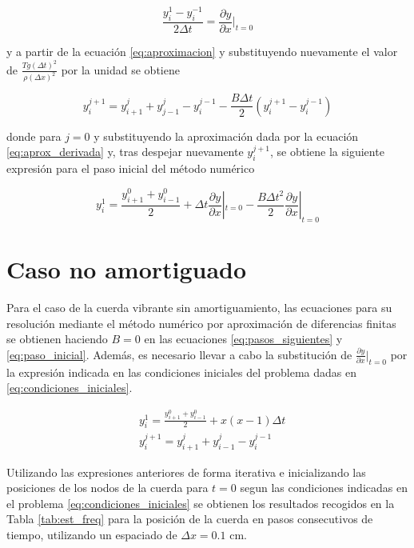 \documentclass[11pt]{article}
\begin{document}
\begin{equation}
\frac{y^1_i - y^{-1}_i}{2\Delta{t}} = \frac{\partial{y}}{\partial{x}}|_{t=0}
\label{eq:aprox_derivada}
\end{equation}

y a partir de la ecuación \eqref{eq:aproximacion} y substituyendo nuevamente el valor de 
$\frac{Tg(\Delta{t})^2}{\rho(\Delta{x})^2}$ por la unidad se obtiene

\begin{equation}
y^{j+1}_i = y^{j}_{i+1} + y^{j}_{j-1} - y^{j-1}_i - \frac{B\Delta{t}}{2}(y^{j+1}_i - y^{j-1}_i)
\end{equation}

donde para $j=0$ y substituyendo la aproximación dada por la ecuación
\ref{eq:aprox_derivada} y, tras despejar nuevamente $y^{j+1}_i$, se obtiene la siguiente
expresión para el paso inicial del método numérico

\begin{equation}
y^1_i = \frac{y^0_{i+1} + y^0_{i-1}}{2} + \Delta{t}\frac{\partial{y}}{\partial{x}}|_{t=0}
	- \frac{B\Delta{t}^2}{2}\frac{\partial{y}}{\partial{x}}|_{t=0}
\label{eq:paso_inicial}
\end{equation}

\section{Caso no amortiguado}
Para el caso de la cuerda vibrante sin amortiguamiento, las ecuaciones para su resolución
mediante el método numérico por aproximación de diferencias finitas se obtienen haciendo
$B=0$ en las ecuaciones \eqref{eq:pasos_siguientes} y \eqref{eq:paso_inicial}. Además, es
necesario llevar a cabo la substitución de $\frac{\partial{y}}{\partial{x}}|_{t=0}$ por la
expresión indicada en las condiciones iniciales del problema dadas en
\eqref{eq:condiciones_iniciales}.

\begin{subequations}
\begin{flalign}
	&y^1_i = \frac{y^0_{i+1} + y^0_{i-1}}{2} + x(x-1)\Delta{t}\\
	&y^{j+1}_i = y^j_{i+1} + y^j_{i-1} - y^{j-1}_i
\end{flalign}
\end{subequations}

Utilizando las expresiones anteriores de forma iterativa e inicializando las posiciones de
los nodos de la cuerda para $t=0$ segun las condiciones indicadas en el problema
\eqref{eq:condiciones_iniciales} se obtienen los resultados recogidos en la Tabla 
\ref{tab:est_freq} para la posición de la cuerda en pasos consecutivos de tiempo, 
utilizando un espaciado de $\Delta{x} = 0.1$ cm.
\end{document}

